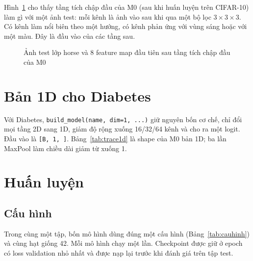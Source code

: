 Hình~\ref{fig:fmapm0} cho thấy tầng tích chập đầu của M0 (sau khi huấn luyện trên CIFAR-10) làm gì với một ảnh test: mỗi
kênh là ảnh vào sau khi qua một bộ lọc $3\times3\times3$. Có kênh làm nổi biên theo một hướng, có kênh phản ứng với
vùng sáng hoặc với một màu. Đây là đầu vào của các tầng sau.

\begin{figure}[H]
  \centering
  \caption{Ảnh test lớp horse và 8 feature map đầu tiên sau tầng tích chập đầu của M0}
  \label{fig:fmapm0}
\end{figure}

\section{Bản 1D cho Diabetes}

Với Diabetes, \texttt{build\_model(name, dim=1, ...)} giữ nguyên bốn cơ chế, chỉ đổi mọi tầng 2D sang 1D, giảm độ rộng
xuống 16/32/64 kênh và cho ra một logit. Đầu vào là \texttt{[B, 1, ]}.
Bảng~\ref{tab:trace1d} là shape của M0 bản 1D; ba lần MaxPool làm chiều dài giảm từ 
xuống 1.

\begin{table}[H]
  \centering
  \caption{Dò shape của M0 bản 1D cho Diabetes}
  \label{tab:trace1d}
  \small
\end{table}

\section{Huấn luyện}

\subsection{Cấu hình}

Trong cùng một tập, bốn mô hình dùng đúng một cấu hình (Bảng~\ref{tab:cauhinh}) và cùng hạt giống 42. Mỗi mô hình chạy
một lần. Checkpoint được giữ ở epoch có loss validation nhỏ nhất và được nạp lại trước khi đánh giá trên tập test.


